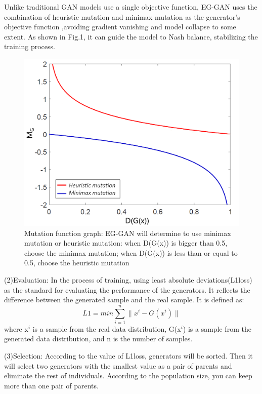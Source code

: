 \documentclass[journal]{IEEEtran}
\begin{document}
Unlike traditional GAN models use a single objective function, EG-GAN uses the combination of heuristic mutation and minimax mutation as the generator's objective function ,avoiding gradient vanishing and model collapse to some extent. As shown in Fig.1, it can guide the model to Nash balance, stabilizing the training process.
\begin{figure}[H]
   \centering
   \includegraphics[width=0.6\linewidth]{figures/Fig2.png}
   \caption{Mutation function graph: EG-GAN will determine to use minimax mutation or heuristic mutation: when D(G(x)) is bigger than 0.5, choose the minimax mutation; when D(G(x)) is less than or equal to 0.5, choose the heuristic mutation}
   \label{fig:Fig2}
\end{figure}

(2)Evaluation: In the process of training, using least absolute deviations\cite{de1991l1}(L1loss) as the standard for evaluating the performance of the generators. It reflects the difference between the generated sample and the real sample. It is defined as:
\begin{equation}
L1 = min\sum^n_{i=1} \|x^i-G(x^i)\|
\end{equation}
where x$^{i}$ is a sample from the real data distribution, G(x$^{i}$) is a sample from the generated data distribution, and n is the number of samples.

(3)Selection: According to the value of L1loss, generators will be sorted. Then it will select two generators with the smallest value as a pair of parents and eliminate the rest of individuals. According to the population size, you can keep more than one pair of parents.
\end{document}

